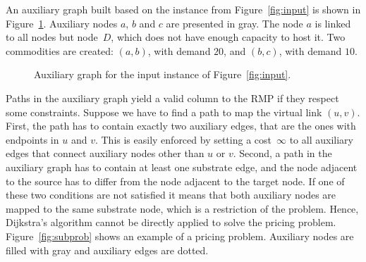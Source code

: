 \documentclass[conference]{IEEEtran}
\begin{document}
An auxiliary graph  built based on the instance from Figure~\ref{fig:input} is shown in Figure~\ref{fig:aux}. 
Auxiliary nodes $a$, $b$ and $c$ are presented in gray. The node $a$ is linked to all nodes but node~$D$, which does not have enough capacity to host it. Two commodities are created: $(a,b)$, with demand $20$, and $(b,c)$, with demand $10$.

\begin{figure}
  \centering
{}
  \caption{Auxiliary graph for the input instance of Figure~\ref{fig:input}.\label{fig:aux}}   
\end{figure}

Paths in the auxiliary graph yield a valid column to the RMP if they respect some constraints.
Suppose we have to find a path to map the virtual link $(u,v)$.
First, the path has to contain exactly two auxiliary edges, that are the ones with endpoints in $u$ and $v$. This is easily enforced by setting a cost~$\infty$ to all auxiliary edges that connect auxiliary nodes other than $u$ or $v$.
Second, a path in the auxiliary graph has to contain at least one substrate edge, 
and the node adjacent to the source has to differ from the node adjacent to the target node. 
If one of these two conditions are not satisfied it means that both auxiliary nodes are mapped to the same substrate node, which is a restriction of the problem.
Hence, Dijkstra's algorithm cannot be directly applied to solve the pricing problem. 
Figure~\ref{fig:subprob} shows an example of a pricing problem. 
Auxiliary nodes are filled with gray and auxiliary edges are dotted. %
\end{document}
